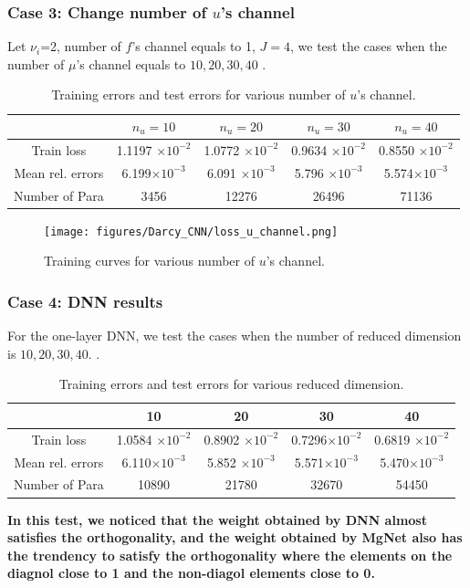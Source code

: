 \subsubsection{Case 3: Change number of $u$'s channel}
Let $\nu_i$=2, number of $f$'s channel equals to 1, $J=4$, we test the cases when the number of $\mu$'s channel equals to $10,20,30,40$
.\begin{table}
	\begin{center}
		\begin{tabular}{|c|c|c|c|c|}
			\hline
			& $n_u=10$ & $n_u=20$ & $n_u=30$& $n_u=40$ \\
			\hline
			Train loss & 1.1197 $\times 10^{-2}$ & 1.0772 $\times 10^{-2}$& 0.9634 $\times 10^{-2}$ & 0.8550 $\times 10^{-2}$\\
			\hline
			Mean rel. errors & 6.199$\times 10^{-3}$ & 6.091 $\times 10^{-3}$ &5.796 $\times 10^{-3}$ &5.574$\times 10^{-3}$ \\
			\hline
			Number of Para & 3456& 12276& 26496 & 71136\\
			\hline
		\end{tabular}\caption{Training errors and test errors for various number of $u$'s channel.}
	\end{center}
\end{table}

\begin{figure}[H]
	\centering
	\texttt{[image: figures/Darcy\_CNN/loss\_u\_channel.png]}
	\caption{Training curves for various number of $u$'s channel.}
\end{figure}

\subsubsection{Case 4: DNN results}
For the one-layer DNN, we test the cases when the number of reduced dimension is $10, 20, 30 ,40$.
.\begin{table}[H]
	\begin{center}
		\begin{tabular}{|c|c|c|c|c|}
			\hline
			& 10 & 20 & 30& 40 \\
			\hline
			Train loss & 1.0584 $\times 10^{-2}$ & 0.8902 $\times 10^{-2}$& 0.7296$\times 10^{-2}$ & 0.6819 $\times 10^{-2}$\\
			\hline
			Mean rel. errors & 6.110$\times 10^{-3}$ & 5.852 $\times 10^{-3}$ &5.571$\times 10^{-3}$ &5.470$\times 10^{-3}$ \\
			\hline
			Number of Para & 10890& 21780& 32670 & 54450\\
			\hline
		\end{tabular}\caption{Training errors and test errors for various reduced dimension.}
	\end{center}
\end{table}
\textbf{In this test, we noticed that the weight obtained by DNN almost satisfies the orthogonality, and the weight obtained by MgNet also has the trendency to satisfy the orthogonality where the elements on the diagnol close to 1 and the non-diagol elements close to 0.}

